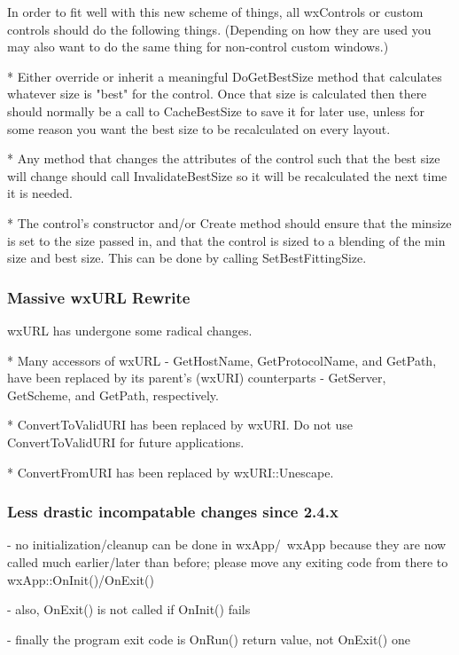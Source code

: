   In order to fit well with this new scheme of things, all wxControls
  or custom controls should do the following things.  (Depending on
  how they are used you may also want to do the same thing for
  non-control custom windows.)

    * Either override or inherit a meaningful DoGetBestSize method
      that calculates whatever size is "best" for the control.  Once
      that size is calculated then there should normally be a call to
      CacheBestSize to save it for later use, unless for some reason
      you want the best size to be recalculated on every layout.

    * Any method that changes the attributes of the control such that
      the best size will change should call InvalidateBestSize so it
      will be recalculated the next time it is needed.

    * The control's constructor and/or Create method should ensure
      that the minsize is set to the size passed in, and that the
      control is sized to a blending of the min size and best size.
      This can be done by calling SetBestFittingSize.

\subsubsection{Massive wxURL Rewrite}

wxURL has undergone some radical changes.

    * Many accessors of wxURL - GetHostName, GetProtocolName, and GetPath,
      have been replaced by its parent's (wxURI) counterparts - GetServer,
      GetScheme, and GetPath, respectively.

    * ConvertToValidURI has been replaced by wxURI.  Do not use
      ConvertToValidURI for future applications.

    * ConvertFromURI has been replaced by wxURI::Unescape.

\subsubsection{Less drastic incompatable changes since 2.4.x}

- no initialization/cleanup can be done in wxApp/~wxApp because they are
  now called much earlier/later than before; please move any exiting code
  from there to wxApp::OnInit()/OnExit()

- also, OnExit() is not called if OnInit() fails

- finally the program exit code is OnRun() return value, not OnExit() one

